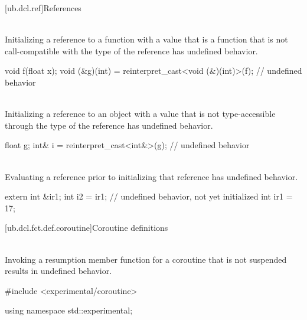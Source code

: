 {[ub.dcl.ref]{References}

\pnum
{} \\
Initializing a reference to a function
with a value that is a function
that is not call-compatible
with the type of the reference
has undefined behavior.

\pnum
\begin{example}
\begin{codeblock}
void f(float x);
void (&g)(int) = reinterpret_cast<void (&)(int)>(f);    // undefined behavior
\end{codeblock}
\end{example}

\pnum
{} \\
Initializing a reference to an object
with a value that is not
type-accessible through
the type of the reference
has undefined behavior.

\pnum
\begin{example}
\begin{codeblock}
float g;
int& i = reinterpret_cast<int&>(g);     // undefined behavior
\end{codeblock}
\end{example}

\pnum
{} \\
Evaluating a reference
prior to initializing that
reference has undefined behavior.

\pnum
\begin{example}
\begin{codeblock}
extern int &ir1;
int i2 = ir1;   // undefined behavior,  not yet initialized
int ir1 = 17;
\end{codeblock}
\end{example}




[ub.dcl.fct.def.coroutine]{Coroutine definitions}

\pnum
{} \\
Invoking a resumption member function for a coroutine that is not suspended results in undefined behavior.

\pnum
\begin{example}
\begin{codeblock}
#include <experimental/coroutine>

using namespace std::experimental;


\end{codeblock}
\end{example}}
